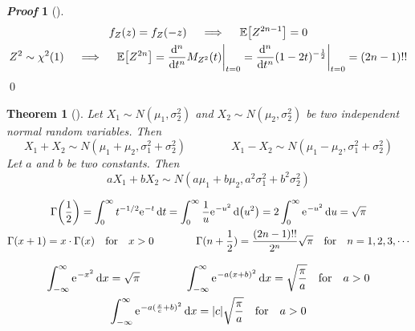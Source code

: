 \documentclass[10pt,UTF8]{article}
\newenvironment{definition box}
{\begin{tcolorbox}[colback=blue!5!white,colframe=blue!75!black,parbox=false,before upper=\par,before lower=\par]}
{\end{tcolorbox}}
\newenvironment{theorem box}
{\begin{tcolorbox}[colback=yellow!5!white,colframe=yellow!75!black,parbox=false,before upper=\par,before lower=\par]}
{\end{tcolorbox}}
\theoremstyle{definition}
\newtheorem{definition inner}{Definition}[section]
\theoremstyle{plain}
\newtheorem{theorem inner}{Theorem}[section]
\newenvironment{theorem}[1][]
{\begin{theorem box}\begin{theorem inner}[#1]\hfill\par}
{\end{theorem inner}\end{theorem box}}
\theoremstyle{definition}
\newtheorem*{proof inner}{\textit{Proof}}
\renewenvironment{proof}[1][]
{\begin{proof inner}[#1]\hfill\par}
{\qed\end{proof inner}}
\theoremstyle{remark}
\newcommand{\e}{\mathrm{e}{\mkern 1 mu}}
\newcommand{\E}[1]{\mathbb{E}\qty[#1]}  %
\begin{document}
\begin{proof}
    \begin{gather*}
        f_Z(z) = f_Z(-z) \quad\implies\quad
        \E{Z^{2 n-1}}=0 \\
        Z^2 \sim \chi^2(1) \quad\implies\quad
        \E{Z^{2 n}} =
        \dv[n]{}{t}M_{Z^2}(t)\bigg|_{t=0}
        = \dv[n]{}{t}{}(1-2 t)^{-\frac{1}{2}}\bigg|_{t=0}
        = (2 n-1)!!
    \end{gather*}
\end{proof}

\begin{theorem}
    Let $X_1\sim N(\mu_1, \sigma_2^2)$ and $X_2\sim N(\mu_2, \sigma_2^2)$
    be two independent normal random variables. Then
    \begin{equation*}
        X_1 + X_2 \sim N(\mu_1+\mu_2, \sigma_1^2+\sigma_2^2)
        \qquad\qquad
        X_1 - X_2 \sim N(\mu_1-\mu_2, \sigma_1^2+\sigma_2^2)
    \end{equation*}
    Let $a$ and $b$ be two constants. Then
    \begin{equation*}
        a X_1 + b X_2 \sim N(a\mu_1+b\mu_2, a^2\sigma_1^2+b^2\sigma_2^2)
    \end{equation*}
\end{theorem}

\begin{gather*}
    \Gamma\qty(\frac{1}{2}) =
    \int_{0}^{\infty}t^{-1/2}\e^{-t}\dd{t}
    = \int_{0}^{\infty}\frac{1}{u}\e^{-u^2}\dd{\qty(u^2)}
    = 2\int_{0}^{\infty}\e^{-u^2}\dd{u}
    = \sqrt{\pi} \\
    \Gamma(x+1) = x\cdot\Gamma(x) \qfor x>0
    \qquad\qquad
    \Gamma(n+\frac{1}{2}) = \frac{(2 n-1)!!}{2^n}\sqrt{\pi}
    \qfor n=1,2,3,\cdots
\end{gather*}

\begin{gather*}
    \int_{-\infty}^{\infty}\e^{-x^2}\dd{x} = \sqrt{\pi} \qquad\qquad
    \int_{-\infty}^{\infty}\e^{-a(x+b)^2}\dd{x} = \sqrt{\frac{\pi}{a}}
    \qfor a>0 \\
    \int_{-\infty}^{\infty}\e^{-a(\frac{x}{c}+b)^2}\dd{x}
    = \abs{c}\sqrt{\frac{\pi}{a}} \qfor a>0 \\
\end{gather*}
\end{document}
